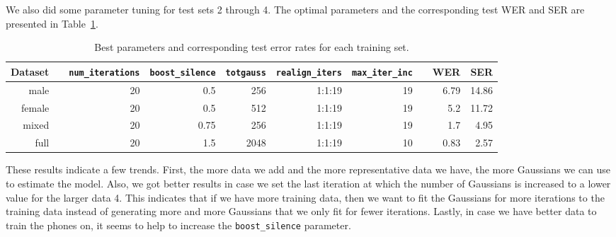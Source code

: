 \documentclass[twocolumn, 11pt]{article}
\begin{document}

We also did some parameter tuning for test sets 2 through 4. The optimal
parameters and the corresponding test WER and SER are presented in
Table~\ref{tab:wer-param}.

\begin{table}\centering
  \begin{tabular}{@{}rcrrrrrcrr@{}}\toprule%
    Dataset & \phantom{a} & \texttt{num\_iterations} & \texttt{boost\_silence}
    & \texttt{totgauss} & \texttt{realign\_iters} & \texttt{max\_iter\_inc}
    & \phantom{a} & WER & SER\\ \midrule%
    male && 20 & 0.5 & 256 & 1:1:19 & 19 && 6.79 & 14.86\\
    female && 20 & 0.5 & 512 & 1:1:19 & 19 && 5.2 & 11.72\\
    mixed && 20 & 0.75 & 256 & 1:1:19 & 19 && 1.7 & 4.95\\
    full && 20 & 1.5 & 2048 & 1:1:19 & 10 && 0.83 & 2.57\\
  \end{tabular}
  \caption{Best parameters and corresponding test error rates for each training set.}\label{tab:wer-param}
\end{table}

These results indicate a few trends. First, the more data we add and the more
representative data we have, the more Gaussians we can use to estimate the
model. Also, we got better results in case we set the last iteration at which
the number of Gaussians is increased to a lower value for the larger data 4. 
This indicates that if we have more training data,
then we want to fit the Gaussians for more iterations to the training data
instead of generating more and more Gaussians that we only fit for fewer
iterations. Lastly, in case we have better data to train the phones on, it seems
to help to increase the \texttt{boost\_silence} parameter.
\end{document}
